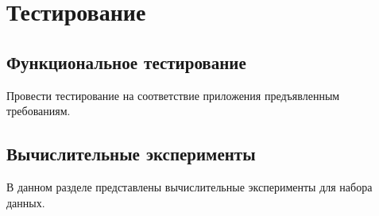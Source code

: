 \newpage
\section{Тестирование}
\label{sec:Experiments}

\subsection{Функциональное тестирование}
Провести тестирование на соответствие приложения предъявленным требованиям. 

\vspace{1.5em}
\subsection{Вычислительные эксперименты}
В данном разделе представлены вычислительные эксперименты для набора данных.